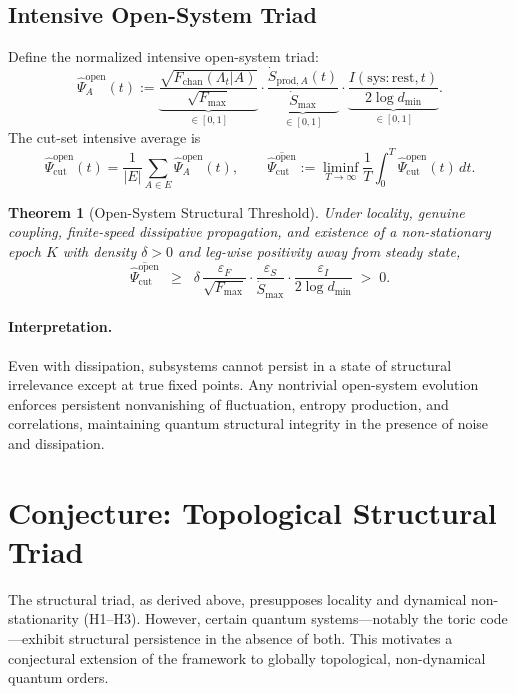 \documentclass[10pt]{article}
\newtheorem{theorem}{Theorem}
\begin{document}
\subsection{Intensive Open-System Triad}
Define the normalized intensive open-system triad:
\begin{equation}
\widehat{\Psi}^{\mathrm{open}}_A(t)
:= \underbrace{\frac{\sqrt{F_{\mathrm{chan}}(\Lambda_t|A)}}{\sqrt{F_{\max}}}}_{\in[0,1]}
\cdot
\underbrace{\frac{\dot{S}_{\mathrm{prod},A}(t)}{\dot{S}_{\max}}}_{\in[0,1]}
\cdot
\underbrace{\frac{I(\mathrm{sys}:\mathrm{rest},t)}{2\log d_{\min}}}_{\in[0,1]}.
\end{equation}
The cut-set intensive average is
\[
\widehat{\Psi}^{\mathrm{open}}_{\mathrm{cut}}(t) = \frac{1}{|E|}\sum_{A\in E}\widehat{\Psi}^{\mathrm{open}}_A(t),
\qquad
\overline{\widehat{\Psi}^{\mathrm{open}}_{\mathrm{cut}}}
:= \liminf_{T\to\infty}\frac{1}{T}\int_0^T \widehat{\Psi}^{\mathrm{open}}_{\mathrm{cut}}(t)\,dt.
\]

\begin{theorem}[Open-System Structural Threshold]
\label{thm:open}
Under locality, genuine coupling, finite-speed dissipative propagation, and existence of a non-stationary epoch $K$ with density $\delta>0$ and leg-wise positivity away from steady state,
\begin{equation}
\overline{\widehat{\Psi}^{\mathrm{open}}_{\mathrm{cut}}}
\;\;\geq\;\;
\delta \,
\frac{\varepsilon_F}{\sqrt{F_{\max}}}
\cdot
\frac{\varepsilon_S}{\dot{S}_{\max}}
\cdot
\frac{\varepsilon_I}{2\log d_{\min}}
\;>\;0.
\end{equation}
\end{theorem}

\paragraph{Interpretation.}
Even with dissipation, subsystems cannot persist in a state of structural irrelevance
except at true fixed points. Any nontrivial open-system evolution enforces persistent
nonvanishing of fluctuation, entropy production, and correlations, maintaining
quantum structural integrity in the presence of noise and dissipation.
\section{Conjecture: Topological Structural Triad }
\label{sec:topo-triad}

The structural triad, as derived above, presupposes locality and dynamical non-stationarity (H1–H3). 
However, certain quantum systems---notably the toric code---exhibit structural persistence in the 
absence of both. This motivates a conjectural extension of the framework to globally topological, 
non-dynamical quantum orders.
\end{document}
